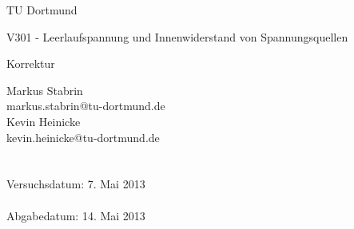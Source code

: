 \documentclass{scrartcl}
\begin{document}
	
	\vspace*{3cm}

	\begin{center}
		\large
		TU Dortmund
	\end{center}

	\begin{center}
		\Huge
		V301 - Leerlaufspannung und Innenwiderstand von Spannungsquellen
	\end{center}

	\begin{center}
		\large
		Korrektur
	\end{center}

	\vspace{5cm} %
	\begin{center}
		\begin{minipage}[b]{8cm}
			\Large
			Markus Stabrin \\
			\normalsize
			markus.stabrin@tu-dortmund.de \\

			\Large
			Kevin Heinicke\\
			\normalsize
			kevin.heinicke@tu-dortmund.de \\
			\\
			\\

			Versuchsdatum: 7. Mai 2013 \\
			\\
			Abgabedatum: 14. Mai 2013
		\end{minipage}
	\end{center}

	\thispagestyle{empty}

	\newpage

	

	

	

	
\end{document}
